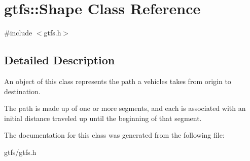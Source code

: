 \hypertarget{classgtfs_1_1Shape}{}\section{gtfs\+:\+:Shape Class Reference}
\label{classgtfs_1_1Shape}


{\ttfamily \#include $<$gtfs.\+h$>$}



\subsection{Detailed Description}
An object of this class represents the path a vehicles takes from origin to destination.

The path is made up of one or more segments, and each is associated with an initial distance traveled up until the beginning of that segment. 

The documentation for this class was generated from the following file\+:\begin{DoxyCompactItemize}
\item 
gtfs/gtfs.\+h\end{DoxyCompactItemize}
